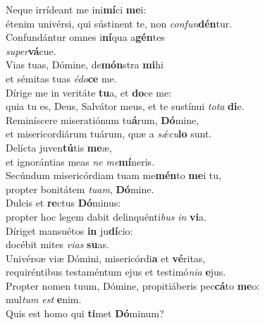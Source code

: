 \evenverse Neque irrídeant me ini\textbf{mí}ci \textbf{me}i:~\*\\
\evenverse étenim univérsi, qui sústinent te, non \textit{con}\textit{fun}\textbf{dén}tur.\\
\oddverse Confundántur omnes i\textbf{ní}qua a\textbf{gén}tes~\*\\
\oddverse \textit{su}\textit{per}\textbf{vá}cue.\\
\evenverse Vias tuas, Dómine, de\textbf{món}stra \textbf{mi}hi~\*\\
\evenverse et sémitas tuas \textit{é}\textit{do}\textbf{ce} me.\\
\oddverse Dírige me in veritáte \textbf{tu}a, et \textbf{do}ce me:~\*\\
\oddverse quia tu es, Deus, Salvátor meus, et te sustínui \textit{to}\textit{ta} \textbf{di}e.\\
\evenverse Reminíscere miseratiónum tu\textbf{á}rum, \textbf{Dó}mine,~\*\\
\evenverse et misericordiárum tuárum, quæ a \textit{sǽ}\textit{cu}\textbf{lo} sunt.\\
\oddverse Delícta juven\textbf{tú}tis \textbf{me}æ,~\*\\
\oddverse et ignorántias meas \textit{ne} \textit{me}\textbf{mí}neris.\\
\evenverse Secúndum misericórdiam tuam me\textbf{mén}to \textbf{me}i tu,~\*\\
\evenverse propter bonitátem \textit{tu}\textit{am}, \textbf{Dó}mine.\\
\oddverse Dulcis et \textbf{re}ctus \textbf{Dó}minus:~\*\\
\oddverse propter hoc legem dabit delinquénti\textit{bus} \textit{in} \textbf{vi}a.\\
\evenverse Díriget mansuétos \textbf{in} ju\textbf{dí}cio:~\*\\
\evenverse docébit mites \textit{vi}\textit{as} \textbf{su}as.\\
\oddverse Univérsæ viæ Dómini, misericórdi\textbf{a} et \textbf{vé}ritas,~\*\\
\oddverse requiréntibus testaméntum ejus et testimó\textit{ni}\textit{a} \textbf{e}jus.\\
\evenverse Propter nomen tuum, Dómine, propitiáberis pec\textbf{cá}to \textbf{me}o:~\*\\
\evenverse mul\textit{tum} \textit{est} \textbf{e}nim.\\
\oddverse Quis est homo qui \textbf{ti}met \textbf{Dó}minum?~\*\\
